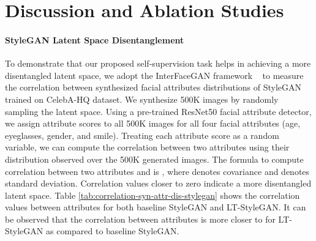 \documentclass[10pt,twocolumn,letterpaper]{article}
\begin{document}
\begin{table}[t]
\centering
{}
\caption{\footnotesize{Classification accuracy (\%) on separation boundaries in
latent space with respect to different attributes of CelebA-HQ. Attributes are A: Age, E: Eyeglasses, G: Gender, and S: Smiling.}}
\label{tab:interfacegan-table}
\end{table}






\section{Discussion and Ablation Studies}
\paragraph{StyleGAN Latent Space Disentanglement}
\par
To demonstrate that our proposed self-supervision task helps in achieving a more disentangled latent space, we adopt the InterFaceGAN framework ~\cite{interface2020shen} to measure the correlation between synthesized facial attributes distributions of StyleGAN trained on CelebA-HQ dataset. We synthesize 500K images by randomly sampling the latent space. Using a pre-trained ResNet50 facial attribute detector, we assign attribute scores to all 500K images for all four facial attributes (age, eyeglasses, gender, and smile). Treating each attribute score as a random variable, we can compute the correlation between two attributes using their distribution observed over the 500K generated images. The formula to compute correlation between two attributes  and  is , where  denotes covariance and  denotes standard deviation. Correlation values closer to zero indicate a more disentangled latent space. Table \ref{tab:correlation-syn-attr-dis-stylegan} shows the correlation values between attributes for both baseline StyleGAN and LT-StyleGAN. It can be observed that the correlation between attributes is more closer to  for LT-StyleGAN as compared to baseline StyleGAN. 
\end{document}
